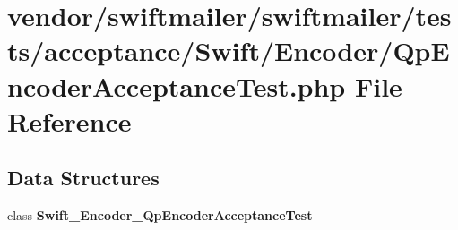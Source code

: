 \section{vendor/swiftmailer/swiftmailer/tests/acceptance/\+Swift/\+Encoder/\+Qp\+Encoder\+Acceptance\+Test.php File Reference}
\label{_qp_encoder_acceptance_test_8php}
\subsection*{Data Structures}
\begin{DoxyCompactItemize}
\item 
class {\bf Swift\+\_\+\+Encoder\+\_\+\+Qp\+Encoder\+Acceptance\+Test}
\end{DoxyCompactItemize}
